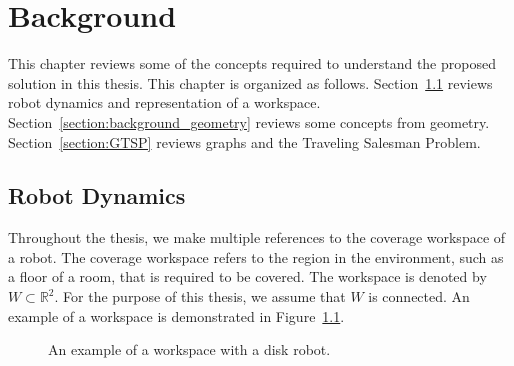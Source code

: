 \documentclass[../main.tex]{subfiles}
\begin{document}
\chapter{Background}
\label{chapter:background}

This chapter reviews some of the concepts required to understand the proposed solution in this thesis. This chapter is organized as follows. Section~\ref{section:background_robot_dynamics} reviews robot dynamics and representation of a workspace. Section~\ref{section:background_geometry} reviews some concepts from geometry. Section~\ref{section:GTSP} reviews graphs and the Traveling Salesman Problem.

\section{Robot Dynamics}
\label{section:background_robot_dynamics}

Throughout the thesis, we make multiple references to the coverage workspace of a robot. The coverage workspace refers to the region in the environment, such as a floor of a room, that is required to be covered. The workspace is denoted by $W\subset\mathbb{R}^2$. For the purpose of this thesis, we assume that $W$ is connected. An example of a workspace is demonstrated in Figure~\ref{fig:workspace_and_system}.

\begin{figure}
	\centering
	
	\caption{An example of a workspace with a disk robot.}
	\label{fig:workspace_and_system}
\end{figure}



\end{document}
